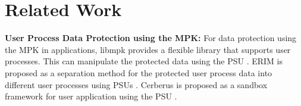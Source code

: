 \section{Related Work}  \label{section:related_works}


{\bf User Process Data Protection using the MPK:}
For data protection using the MPK in applications, libmpk provides a flexible
library that supports user processes. This can manipulate the protected data
using the PSU \cite{libmpk}.
ERIM is proposed as a separation method for the protected user process data into
different user processes using PSUs \cite{erim}.
%
Cerberus is proposed as a sandbox framework for user application using the PSU
\cite{Voulimeneas22eurosys}.

